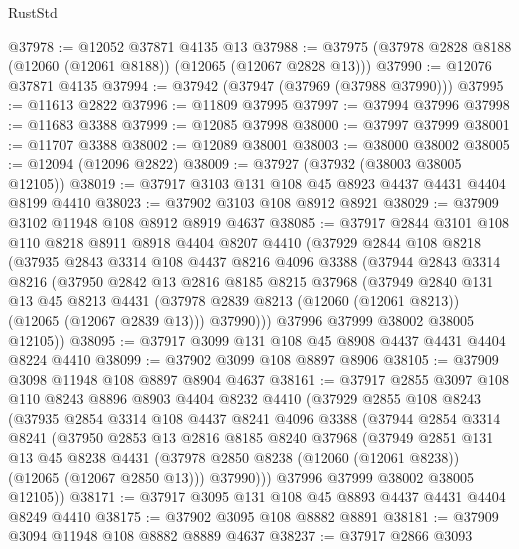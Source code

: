 \begin{lexlean}{RustStd}
\begin{coremodule}
@37978 := @12052 @37871 @4135 @13
@37988 := @37975 (@37978 @2828 @8188 (@12060 (@12061 @8188)) (@12065 (@12067 @2828 @13)))
@37990 := @12076 @37871 @4135
@37994 := @37942 (@37947 (@37969 (@37988 @37990)))
@37995 := @11613 @2822
@37996 := @11809 @37995
@37997 := @37994 @37996
@37998 := @11683 @3388
@37999 := @12085 @37998
@38000 := @37997 @37999
@38001 := @11707 @3388
@38002 := @12089 @38001
@38003 := @38000 @38002
@38005 := @12094 (@12096 @2822)
@38009 := @37927 (@37932 (@38003 @38005 @12105))
@38019 := @37917 @3103 @131 @108 @45 @8923 @4437 @4431 @4404 @8199 @4410
@38023 := @37902 @3103 @108 @8912 @8921
@38029 := @37909 @3102 @11948 @108 @8912 @8919 @4637
@38085 := @37917
    @2844
    @3101
    @108
    @110
    @8218
    @8911
    @8918
    @4404
    @8207
    @4410
    (@37929
      @2844
      @108
      @8218
      (@37935
        @2843
        @3314
        @108
        @4437
        @8216
        @4096
        @3388
        (@37944
          @2843
          @3314
          @8216
          (@37950
            @2842
            @13
            @2816
            @8185
            @8215
            @37968
            (@37949
              @2840
              @131
              @13
              @45
              @8213
              @4431
              (@37978 @2839 @8213 (@12060 (@12061 @8213)) (@12065 (@12067 @2839 @13)))
              @37990)))
        @37996
        @37999
        @38002
        @38005
        @12105))
@38095 := @37917 @3099 @131 @108 @45 @8908 @4437 @4431 @4404 @8224 @4410
@38099 := @37902 @3099 @108 @8897 @8906
@38105 := @37909 @3098 @11948 @108 @8897 @8904 @4637
@38161 := @37917
    @2855
    @3097
    @108
    @110
    @8243
    @8896
    @8903
    @4404
    @8232
    @4410
    (@37929
      @2855
      @108
      @8243
      (@37935
        @2854
        @3314
        @108
        @4437
        @8241
        @4096
        @3388
        (@37944
          @2854
          @3314
          @8241
          (@37950
            @2853
            @13
            @2816
            @8185
            @8240
            @37968
            (@37949
              @2851
              @131
              @13
              @45
              @8238
              @4431
              (@37978 @2850 @8238 (@12060 (@12061 @8238)) (@12065 (@12067 @2850 @13)))
              @37990)))
        @37996
        @37999
        @38002
        @38005
        @12105))
@38171 := @37917 @3095 @131 @108 @45 @8893 @4437 @4431 @4404 @8249 @4410
@38175 := @37902 @3095 @108 @8882 @8891
@38181 := @37909 @3094 @11948 @108 @8882 @8889 @4637
@38237 := @37917
    @2866
    @3093

\end{coremodule}
\end{lexlean}
